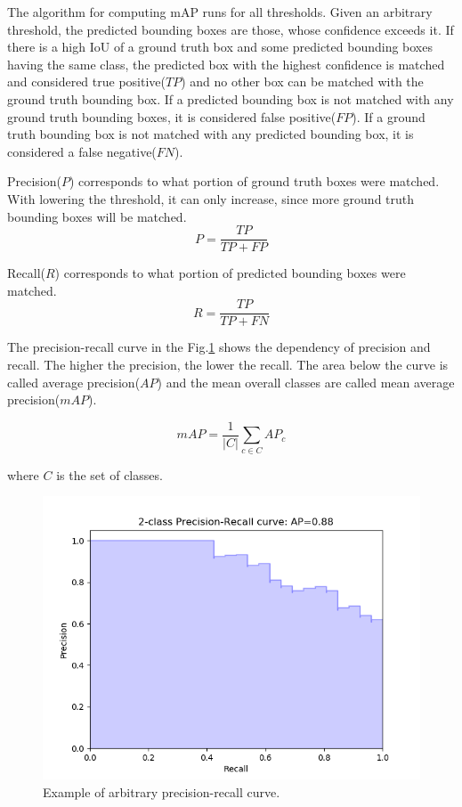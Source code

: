 \documentclass[a4paper,11pt,titlepage,twoside]{article}
\numberwithin{figure}{section}
\begin{document}
The algorithm for computing mAP runs for all thresholds. Given an arbitrary threshold, the predicted bounding boxes are those, whose confidence exceeds it. If there is a high IoU of a ground truth box and some predicted bounding boxes having the same class, the predicted box with the highest confidence is matched and considered true positive($TP$) and no other box can be matched with the ground truth bounding box. If a predicted bounding box is not matched with any ground truth bounding boxes, it is considered false positive($FP$). If a ground truth bounding box is not matched with any predicted bounding box, it is considered a false negative($FN$).

Precision($P$) corresponds to what portion of ground truth boxes were matched. With lowering the threshold, it can only increase, since more ground truth bounding boxes will be matched.
\begin{equation}
P = \frac{TP}{TP + FP}
\end{equation}

Recall($R$) corresponds to what portion of predicted bounding boxes were matched. 
\begin{equation}
R = \frac{TP}{TP + FN}
\end{equation}

The precision-recall curve in the Fig.\ref{fig:precision-recall} shows the dependency of precision and recall. The higher the precision, the lower the recall. The area below the curve is called average precision($AP$) and the mean overall classes are called mean average precision($mAP$).

\begin{equation}
mAP = \frac{1}{|C|} \sum_{c \in C} AP_c
\end{equation}

where $C$ is the set of classes.

\begin{figure}[H]
\centering
\includegraphics[width=1\linewidth]{fig/precision-recall.png}
\caption{Example of arbitrary precision-recall curve.}
\label{fig:precision-recall}
\end{figure}
\end{document}
